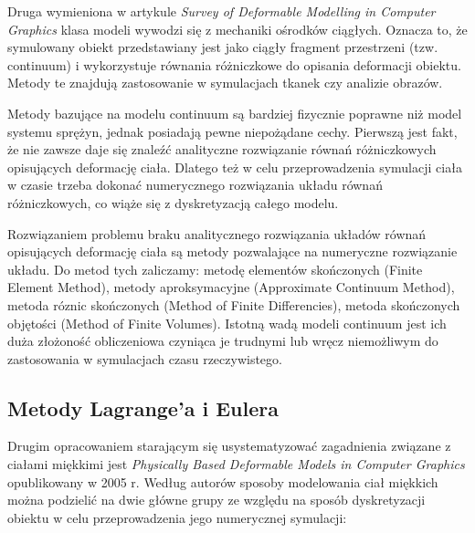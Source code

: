 Druga wymieniona w artykule \textit{Survey of Deformable Modelling in Computer Graphics}
klasa modeli wywodzi się z mechaniki ośrodków
ciągłych. Oznacza to, że symulowany obiekt przedstawiany jest jako ciągły
fragment przestrzeni (tzw. continuum) i wykorzystuje równania różniczkowe do
opisania deformacji obiektu. Metody te znajdują zastosowanie w symulacjach
tkanek czy analizie obrazów.\cite{TR97-19}

Metody bazujące na modelu continuum są bardziej fizycznie poprawne niż model
systemu sprężyn\cite{TR97-19}, jednak posiadają pewne niepożądane cechy.
Pierwszą jest fakt, że nie zawsze daje się znaleźć analityczne rozwiązanie
równań różniczkowych opisujących deformację ciała. Dlatego też w celu
przeprowadzenia symulacji ciała w czasie trzeba dokonać numerycznego rozwiązania
układu równań różniczkowych, co wiąże się z dyskretyzacją całego modelu.

Rozwiązaniem problemu braku analitycznego rozwiązania układów równań opisujących
deformację ciała są metody pozwalające na numeryczne rozwiązanie układu. Do
metod tych zaliczamy: metodę elementów skończonych (Finite Element Method),
 metody aproksymacyjne (Approximate Continuum Method), metoda róznic skończonych
 (Method of Finite Differencies), metoda skończonych objętości (Method of Finite
 Volumes). Istotną wadą modeli continuum jest ich duża złożoność obliczeniowa
czyniąca je trudnymi lub wręcz niemożliwym do zastosowania w symulacjach czasu
rzeczywistego.

\subsection{Metody Lagrange'a i Eulera}

Drugim opracowaniem starającym się usystematyzować zagadnienia związane z
ciałami miękkimi jest \textit{Physically Based Deformable Models in Computer
Graphics} opublikowany w 2005 r. Według autorów sposoby modelowania ciał miękkich można
podzielić na dwie główne grupy ze względu na sposób dyskretyzacji
obiektu w celu przeprowadzenia jego numerycznej symulacji:

